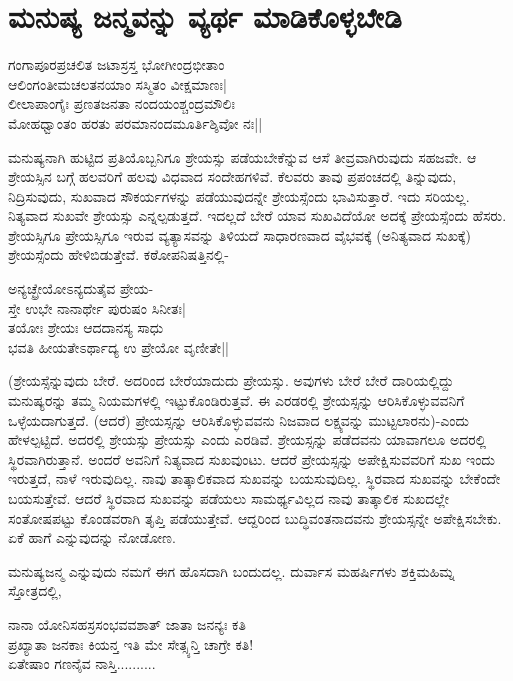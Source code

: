 \chapter{ಮನುಷ್ಯ ಜನ್ಮವನ್ನು ವ್ಯರ್ಥ ಮಾಡಿಕೊಳ್ಳಬೇಡಿ}\label{chap6}

\begin{shloka}
ಗಂಗಾಪೂರಪ್ರಚಲಿತ ಜಟಾಸ್ರಸ್ತ ಭೋಗೀಂದ್ರಭೀತಾಂ\\
ಆಲಿಂಗಂತೀಮಚಲತನಯಾಂ ಸಸ್ಮಿತಂ ವೀಕ್ಷಮಾಣಃ|\\
ಲೀಲಾಪಾಂಗೈಃ ಪ್ರಣತಜನತಾ ನಂದಯಂಶ್ಚಂದ್ರಮೌಲಿಃ\\
ಮೋಹಧ್ವಾಂತಂ ಹರತು ಪರಮಾನಂದಮೂರ್ತಿಶ್ಶಿವೋ ನಃ||
\end{shloka}

ಮನುಷ್ಯನಾಗಿ ಹುಟ್ಟಿದ ಪ್ರತಿಯೊಬ್ಬನಿಗೂ ಶ್ರೇಯಸ್ಸು ಪಡೆಯಬೇಕೆನ್ನುವ ಆಸೆ ತೀವ್ರವಾಗಿರುವುದು ಸಹಜವೇ. ಆ ಶ್ರೇಯಸ್ಸಿನ ಬಗ್ಗೆ ಹಲವರಿಗೆ ಹಲವು ವಿಧವಾದ ಸಂದೇಹಗಳಿವೆ. ಕೆಲವರು ತಾವು ಪ್ರಪಂಚದಲ್ಲಿ ತಿನ್ನುವುದು, ನಿದ್ರಿಸುವುದು, ಸುಖವಾದ ಸೌಕರ್ಯಗಳನ್ನು ಪಡೆಯುವುದನ್ನೇ ಶ್ರೇಯಸ್ಸೆಂದು ಭಾವಿಸುತ್ತಾರೆ. ಇದು ಸರಿಯಲ್ಲ. ನಿತ್ಯವಾದ ಸುಖವೇ ಶ್ರೇಯಸ್ಸು ಎನ್ನಲ್ಪಡುತ್ತದೆ. ಇದಲ್ಲದೆ ಬೇರೆ ಯಾವ ಸುಖವಿದೆಯೋ ಅದಕ್ಕೆ ಪ್ರೇಯಸ್ಸೆಂದು ಹೆಸರು. ಶ್ರೇಯಸ್ಸಿಗೂ ಪ್ರೇಯಸ್ಸಿಗೂ ಇರುವ ವ್ಯತ್ಯಾಸವನ್ನು ತಿಳಿಯದೆ ಸಾಧಾರಣವಾದ ವೈಭವಕ್ಕೆ (ಅನಿತ್ಯವಾದ ಸುಖಕ್ಕೆ) ಶ್ರೇಯಸ್ಸೆಂದು ಹೇಳಿಬಿಡುತ್ತೇವೆ. ಕಠೋಪನಿಷತ್ತಿನಲ್ಲಿ-

\begin{shloka}
ಅನ್ಯಚ್ಛ್ರೇಯೋಽನ್ಯದುತೈವ ಪ್ರೇಯ-\\
ಸ್ತೇ ಉಭೇ ನಾನಾರ್ಥೇ ಪುರುಷಂ ಸಿನೀತಃ|\\
ತಯೋಃ ಶ್ರೇಯಃ ಆದದಾನಸ್ಯ ಸಾಧು\\
ಭವತಿ ಹೀಯತೇಽರ್ಥಾದ್ಯ ಉ ಪ್ರೇಯೋ ವೃಣೀತೇ||
\end{shloka}

(ಶ್ರೇಯಸ್ಸೆನ್ನುವುದು ಬೇರೆ. ಅದರಿಂದ ಬೇರೆಯಾದುದು ಪ್ರೇಯಸ್ಸು. ಅವುಗಳು ಬೇರೆ ಬೇರೆ ದಾರಿಯಲ್ಲಿದ್ದು ಮನುಷ್ಯರನ್ನು ತಮ್ಮ ನಿಯಮಗಳಲ್ಲಿ ಇಟ್ಟುಕೊಂಡಿರುತ್ತವೆ. ಈ ಎರಡರಲ್ಲಿ ಶ್ರೇಯಸ್ಸನ್ನು ಆರಿಸಿಕೊಳ್ಳುವವನಿಗೆ ಒಳ್ಳೆಯದಾಗುತ್ತದೆ. (ಆದರೆ) ಪ್ರೇಯಸ್ಸನ್ನು ಆರಿಸಿಕೊಳ್ಳುವವನು ನಿಜವಾದ ಲಕ್ಷ್ಯವನ್ನು ಮುಟ್ಟಲಾರನು)-ಎಂದು ಹೇಳಲ್ಪಟ್ಟಿದೆ. ಅದರಲ್ಲಿ ಶ್ರೇಯಸ್ಸು ಪ್ರೇಯಸ್ಸು ಎಂದು ಎರಡಿವೆ. ಶ್ರೇಯಸ್ಸನ್ನು ಪಡೆದವನು ಯಾವಾಗಲೂ ಅದರಲ್ಲಿ ಸ್ಥಿರವಾಗಿರುತ್ತಾನೆ. ಅಂದರೆ ಅವನಿಗೆ ನಿತ್ಯವಾದ ಸುಖವುಂಟು. ಆದರೆ ಪ್ರೇಯಸ್ಸನ್ನು ಅಪೇಕ್ಷಿಸುವವರಿಗೆ ಸುಖ ಇಂದು ಇರುತ್ತದೆ, ನಾಳೆ ಇರುವುದಿಲ್ಲ. ನಾವು ತಾತ್ಕಾಲಿಕವಾದ ಸುಖವನ್ನು ಬಯಸುವುದಿಲ್ಲ. ಸ್ಥಿರವಾದ ಸುಖವನ್ನು ಬೇಕೆಂದೇ ಬಯಸುತ್ತೇವೆ. ಆದರೆ ಸ್ಥಿರವಾದ ಸುಖವನ್ನು ಪಡೆಯಲು ಸಾಮರ್ಥ್ಯವಿಲ್ಲದ ನಾವು ತಾತ್ಕಾಲಿಕ ಸುಖದಲ್ಲೇ ಸಂತೋಷಪಟ್ಟು ಕೊಂಡವರಾಗಿ ತೃಪ್ತಿ ಪಡೆಯುತ್ತೇವೆ. ಆದ್ದರಿಂದ ಬುದ್ಧಿವಂತನಾದವನು ಶ್ರೇಯಸ್ಸನ್ನೇ ಅಪೇಕ್ಷಿಸಬೇಕು. ಏಕೆ ಹಾಗೆ ಎನ್ನುವುದನ್ನು ನೋಡೋಣ.

ಮನುಷ್ಯಜನ್ಮ ಎನ್ನುವುದು ನಮಗೆ ಈಗ ಹೊಸದಾಗಿ ಬಂದುದಲ್ಲ. ದುರ್ವಾಸ ಮಹರ್ಷಿಗಳು ಶಕ್ತಿಮಹಿಮ್ನ ಸ್ತೋತ್ರದಲ್ಲಿ,

\begin{shloka}
ನಾನಾ  ಯೋನಿಸಹಸ್ರಸಂಭವವಶಾತ್  ಜಾತಾ ಜನನ್ಯಃ ಕತಿ\\
ಪ್ರಖ್ಯಾತಾ ಜನಕಾಃ ಕಿಯನ್ತ ಇತಿ ಮೇ ಸೇತ್ಸ್ಯನ್ತಿ ಚಾಗ್ರೇ ಕತಿ!\\
ಏತೇಷಾಂ ಗಣನೈವ ನಾಸ್ತಿ..........
\end{shloka}

